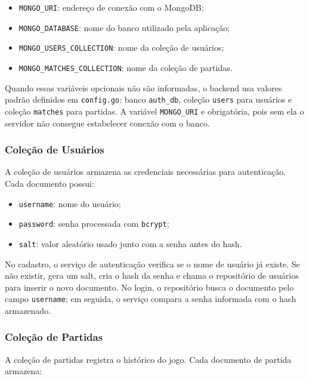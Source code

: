 \documentclass[12pt]{article}
\begin{document}
\begin{itemize}
    \item \texttt{MONGO\_URI}: endereço de conexão com o MongoDB;
    \item \texttt{MONGO\_DATABASE}: nome do banco utilizado pela aplicação;
    \item \texttt{MONGO\_USERS\_COLLECTION}: nome da coleção de usuários;
    \item \texttt{MONGO\_MATCHES\_COLLECTION}: nome da coleção de partidas.
\end{itemize}

Quando essas variáveis opcionais não são informadas, o backend usa valores padrão definidos em \texttt{config.go}: banco \texttt{auth\_db}, coleção \texttt{users} para usuários e coleção \texttt{matches} para partidas. A variável \texttt{MONGO\_URI} e obrigatória, pois sem ela o servidor não consegue estabelecer conexão com o banco.

\subsubsection{Coleção de Usuários}

A coleção de usuários armazena as credenciais necessárias para autenticação. Cada documento possui:

\begin{itemize}
    \item \texttt{username}: nome do usuário;
    \item \texttt{password}: senha processada com \texttt{bcrypt};
    \item \texttt{salt}: valor aleatório usado junto com a senha antes do hash.
\end{itemize}

No cadastro, o serviço de autenticação verifica se o nome de usuário já existe. Se não existir, gera um salt, cria o hash da senha e chama o repositório de usuários para inserir o novo documento. No login, o repositório busca o documento pelo campo \texttt{username}; em seguida, o serviço compara a senha informada com o hash armazenado.

\subsubsection{Coleção de Partidas}

A coleção de partidas registra o histórico do jogo. Cada documento de partida armazena:
\end{document}
